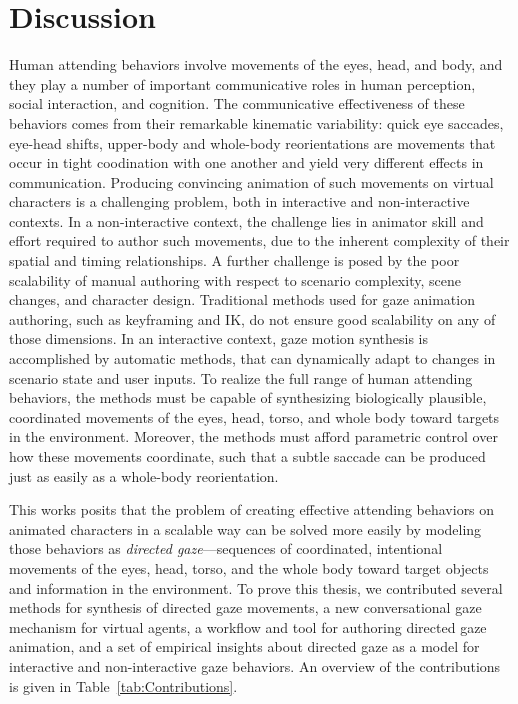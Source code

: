 \pagestyle{deposit}

\chapter{Discussion}
\label{cha:Discussion}

Human attending behaviors involve movements of the eyes, head, and body, and they play a number of important communicative roles in human perception, social interaction, and cognition. The communicative effectiveness of these behaviors comes from their remarkable kinematic variability: quick eye saccades, eye-head shifts, upper-body and whole-body reorientations are movements that occur in tight coodination with one another and yield very different effects in communication. Producing convincing animation of such movements on virtual characters is a challenging problem, both in interactive and non-interactive contexts. In a non-interactive context, the challenge lies in animator skill and effort required to author such movements, due to the inherent complexity of their spatial and timing relationships. A further challenge is posed by the poor scalability of manual authoring with respect to scenario complexity, scene changes, and character design. Traditional methods used for gaze animation authoring, such as keyframing and IK, do not ensure good scalability on any of those dimensions. In an interactive context, gaze motion synthesis is accomplished by automatic methods, that can dynamically adapt to changes in scenario state and user inputs. To realize the full range of human attending behaviors, the methods must be capable of synthesizing biologically plausible, coordinated movements of the eyes, head, torso, and whole body toward targets in the environment. Moreover, the methods must afford parametric control over how these movements coordinate, such that a subtle saccade can be produced just as easily as a whole-body reorientation.

This works posits that the problem of creating effective attending behaviors on animated characters in a scalable way can be solved more easily by modeling those behaviors as \emph{directed gaze}---sequences of coordinated, intentional movements of the eyes, head, torso, and the whole body toward target objects and information in the environment. To prove this thesis, we contributed several methods for synthesis of directed gaze movements, a new conversational gaze mechanism for virtual agents, a workflow and tool for authoring directed gaze animation, and a set of empirical insights about directed gaze as a model for interactive and non-interactive gaze behaviors. An overview of the contributions is given in Table~\ref{tab:Contributions}.

